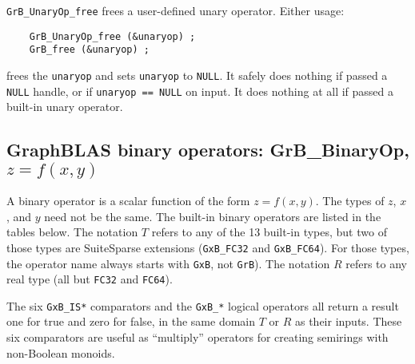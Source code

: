 \documentclass[12pt]{article}
\begin{document}
\verb'GrB_UnaryOp_free' frees a user-defined unary operator.
Either usage:

    {\small
    \begin{verbatim}
    GrB_UnaryOp_free (&unaryop) ;
    GrB_free (&unaryop) ; \end{verbatim}}

\noindent
frees the \verb'unaryop' and sets \verb'unaryop' to \verb'NULL'.
It safely does nothing if passed a \verb'NULL'
handle, or if \verb'unaryop == NULL' on input.
It does nothing at all if passed a built-in unary operator.

\newpage
\subsection{GraphBLAS binary operators: {\sf GrB\_BinaryOp}, $z=f(x,y)$} %
\label{binaryop}

A binary operator is a scalar function of the form $z=f(x,y)$.  The types of
$z$, $x$, and $y$ need not be the same.  The built-in binary operators are
listed in the tables below.  The notation $T$ refers to any of the 13
built-in types, but two of those types are SuiteSparse extensions
(\verb'GxB_FC32' and \verb'GxB_FC64').  For those types, the operator name
always starts with \verb'GxB', not \verb'GrB').
The notation $R$ refers to any real type (all but \verb'FC32' and \verb'FC64').

The six \verb'GxB_IS*' comparators and the \verb'GxB_*' logical
operators all return a result one for true and zero for false, in the same
domain $T$ or $R$ as their inputs.  These six comparators are useful
as ``multiply'' operators for creating semirings with non-Boolean monoids.
\end{document}
